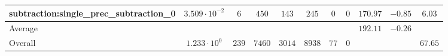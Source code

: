 \begin{tabular}{|l|c|c|c|c|c|c|c|c|c|c|}
subtraction:single\_prec\_subtraction\_0         & $ 3.509 \cdot 10^{-2} $ & $ 6      $ & $ 450  $ & $ 143  $ & $ 245   $ & $ 0  $ & $ 0 $ & $ 170.97      $ & $ -0.85   $ & $ 6.03    $ \\
\hline
Average                                          & $                     $ & $        $ & $      $ & $      $ & $       $ & $    $ & $   $ & $ 192.11      $ & $ -0.26   $ & $         $ \\
\hline
Overall                                          & $ 1.233 \cdot 10^{0}  $ & $ 239    $ & $ 7460 $ & $ 3014 $ & $ 8938  $ & $ 77 $ & $ 0 $ & $             $ & $         $ & $ 67.65   $ \\
\hline
\end{tabular}
